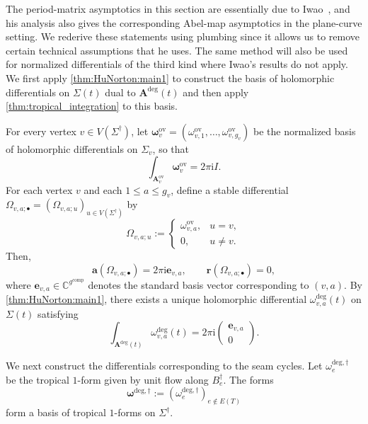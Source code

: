 \documentclass[12pt]{amsart}
\numberwithin{equation}{section}
\theoremstyle{definition}
\newcommand{\C}{\mathbb{C}}
\def\vertices{V}
\def\edges{E}
\def\trop{\dagger}
\def\imunit{{\mathrm{i}}}
\def\mcurve{\Sigma}
\def\tropmcurve{\mcurve^\trop}
\begin{document}
The period-matrix asymptotics in this section are essentially due to Iwao~\cite[Theorem~4.3.1]{Iwao}, and his analysis also gives the corresponding Abel-map asymptotics in the plane-curve setting. We rederive these statements using plumbing since it allows us to remove certain technical assumptions that he uses. The same method will also be used for normalized differentials of the third kind where Iwao's results do not apply. We first apply \cref{thm:HuNorton:main1} to construct the basis of holomorphic differentials on $\mcurve(t)$ dual to $\bm A^{\mathrm{deg}}(t)$ and then apply \cref{thm:tropical_integration} to this basis. 

For every vertex $v\in\vertices(\tropmcurve)$, let $\bm \omega^{\mathrm{ov}}_v = (\omega_{v,1}^{\mathrm{ov}},\dots,\omega_{v,g_v}^{\mathrm{ov}})
$ be the normalized basis of holomorphic differentials on $\mcurve_v$, so that
\[
\int_{\bm A_{v}^{\mathrm{ov}}}
\bm \omega_{v}^{\mathrm{ov}}
=
2\pi\imunit I.
\]
For each vertex $v$ and each $1\leq a\leq g_v$, define a stable
differential $\Omega_{v,a;\bullet}
=
(
\Omega_{v,a;u}
)_{u\in\vertices(\tropmcurve)}
$ by
\[
\Omega_{v,a;u}
:=
\begin{cases}
\omega_{v,a}^{\mathrm{ov}},
&
u=v,
\\
0,
&
u\neq v.
\end{cases}
\]
Then,
\[
\bm a(\Omega_{v,a;\bullet})
=
2\pi\imunit \bm e_{v,a},
\qquad
\bm r(\Omega_{v,a;\bullet})
=
0,
\]
where $\bm e_{v,a} \in \C^{g^{\mathrm{comp}}}$ denotes the standard basis
vector corresponding to $(v,a)$. By
\cref{thm:HuNorton:main1}, there exists a unique holomorphic differential $\omega_{v,a}^{\mathrm{deg}}(t)$ on $\mcurve(t)$ satisfying
\[
\int_{\bm A^{\mathrm{deg}}(t)}
\omega_{v,a}^{\mathrm{deg}}(t)
=
2\pi\imunit
\begin{pmatrix}
\bm e_{v,a}\\
0
\end{pmatrix}.
\]


We next construct the differentials corresponding to the seam cycles.
Let
$
\omega_e^{\mathrm{deg},\trop}
$
be the tropical $1$-form given by unit flow along $B_e^\trop$. The forms
\[
\bm\omega^{\mathrm{deg},\trop}
:=
(
\omega_e^{\mathrm{deg},\trop}
)_{e \notin \edges(T)}
\]
form a basis of tropical $1$-forms on $\tropmcurve$.
\end{document}
